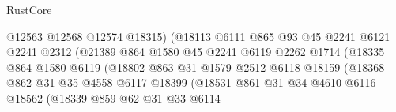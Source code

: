 \begin{lexlean}{RustCore}
\begin{coremodule}
                                        @12563
                                        @12568
                                        @12574
                                        @18315)
                                      (@18113
                                        @6111
                                        @865
                                        @93
                                        @45
                                        @2241
                                        @6121
                                        @2241
                                        @2312
                                        (@21389
                                          @864
                                          @1580
                                          @45
                                          @2241
                                          @6119
                                          @2262
                                          @1714
                                          (@18335
                                            @864
                                            @1580
                                            @6119
                                            (@18802
                                              @863
                                              @31
                                              @1579
                                              @2512
                                              @6118
                                              @18159
                                              (@18368
                                                @862
                                                @31
                                                @35
                                                @4558
                                                @6117
                                                @18399
                                                (@18531
                                                  @861
                                                  @31
                                                  @34
                                                  @4610
                                                  @6116
                                                  @18562
                                                  (@18339
                                                    @859
                                                    @62
                                                    @31
                                                    @33
                                                    @6114

\end{coremodule}
\end{lexlean}
